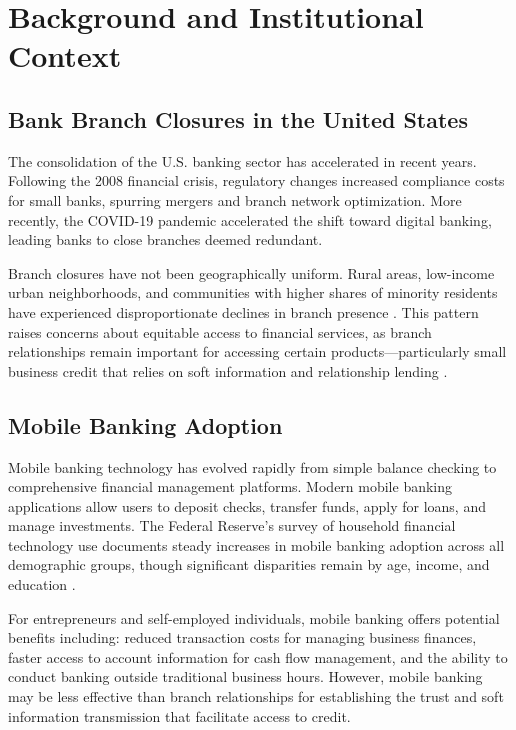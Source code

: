 \documentclass[12pt]{article}
\begin{document}
\section{Background and Institutional Context}

\subsection{Bank Branch Closures in the United States}

The consolidation of the U.S. banking sector has accelerated in recent years. Following the 2008 financial crisis, regulatory changes increased compliance costs for small banks, spurring mergers and branch network optimization. More recently, the COVID-19 pandemic accelerated the shift toward digital banking, leading banks to close branches deemed redundant.

Branch closures have not been geographically uniform. Rural areas, low-income urban neighborhoods, and communities with higher shares of minority residents have experienced disproportionate declines in branch presence \citep{morgan2016, ergungor2010}. This pattern raises concerns about equitable access to financial services, as branch relationships remain important for accessing certain products---particularly small business credit that relies on soft information and relationship lending \citep{petersen2002, berger2005}.

\subsection{Mobile Banking Adoption}

Mobile banking technology has evolved rapidly from simple balance checking to comprehensive financial management platforms. Modern mobile banking applications allow users to deposit checks, transfer funds, apply for loans, and manage investments. The Federal Reserve's survey of household financial technology use documents steady increases in mobile banking adoption across all demographic groups, though significant disparities remain by age, income, and education \citep{fed2022}.

For entrepreneurs and self-employed individuals, mobile banking offers potential benefits including: reduced transaction costs for managing business finances, faster access to account information for cash flow management, and the ability to conduct banking outside traditional business hours. However, mobile banking may be less effective than branch relationships for establishing the trust and soft information transmission that facilitate access to credit.
\end{document}
